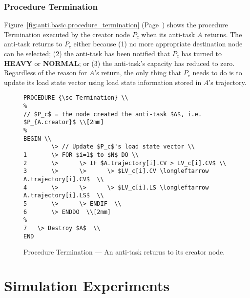 \subsubsection {Procedure \sc Termination}
%
Figure~\ref{fig:anti.basic.procedure_termination} 
(Page~\pageref{fig:anti.basic.procedure_termination})
shows the procedure {\sc Termination\/}
executed by the creator node $P_c$ when its anti-task $A$ returns.
The anti-task returns to $P_c$ either because
(1) no more appropriate destination node can be selected;
(2) the anti-task has been notified that $P_c$
has turned to {\bf HEAVY} or {\bf NORMAL}; or
(3) the anti-task's capacity has reduced to zero.
%
Regardless of the reason for $A$'s return,
the only thing that $P_c$ needs to do is
to update its load state vector
using load state information stored in $A$'s trajectory.



\begin{figure}[p]
\begin{verbatim}
PROCEDURE {\sc Termination} \\
%
// $P_c$ = the node created the anti-task $A$, i.e. $P_{A.creator}$ \\[2mm]
%
BEGIN \\
        \> // Update $P_c$'s load state vector \\
1       \> FOR $i=1$ to $N$ DO \\
2       \>      \> IF $A.trajectory[i].CV > LV_c[i].CV$ \\
3       \>      \>      \> $LV_c[i].CV \longleftarrow A.trajectory[i].CV$  \\
4       \>      \>      \> $LV_c[i].LS \longleftarrow A.trajectory[i].LS$  \\
5       \>      \> ENDIF  \\
6       \> ENDDO  \\[2mm]
%
7	\> Destroy $A$  \\
END
\end{verbatim}
\caption {Procedure {\sc Termination} --- An anti-task returns to its creator node.}
\label{fig:anti.basic.procedure_termination}
\label{fig:anti.basic.result_I.trace_anti}
\label{fig:anti.basic.result_I.trace_sym}
\end{figure}




\section{Simulation Experiments}
\label{sec:anti.basic.simulation}


